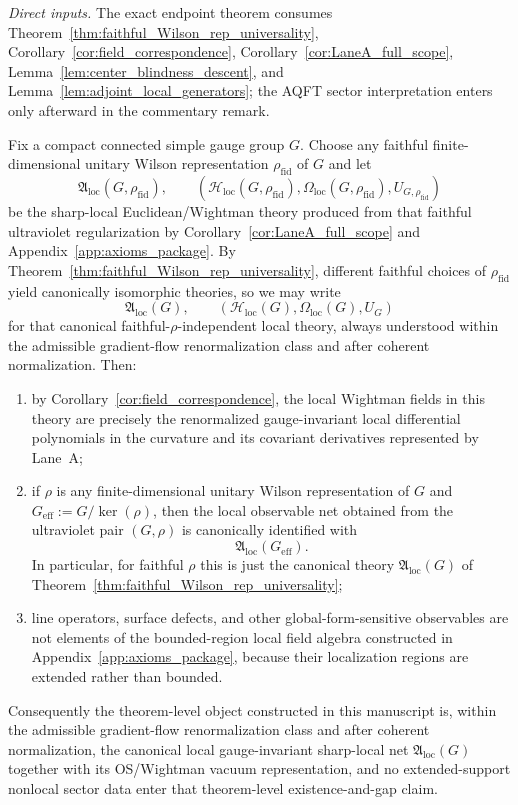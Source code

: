 \noindent\emph{Direct inputs.} The exact endpoint theorem consumes Theorem~\ref{thm:faithful_Wilson_rep_universality}, Corollary~\ref{cor:field_correspondence}, Corollary~\ref{cor:LaneA_full_scope}, Lemma~\ref{lem:center_blindness_descent}, and Lemma~\ref{lem:adjoint_local_generators}; the AQFT sector interpretation enters only afterward in the commentary remark.\par

\begin{theorem}
\label{thm:global_form_local_endpoint}
Fix a compact connected simple gauge group $G$.
Choose any faithful finite-dimensional unitary Wilson representation $\rho_{\mathrm{fid}}$ of $G$ and let
\[
\mathfrak A_{\mathrm{loc}}(G,\rho_{\mathrm{fid}}),
\qquad
(\mathcal H_{\mathrm{loc}}(G,\rho_{\mathrm{fid}}),\Omega_{\mathrm{loc}}(G,\rho_{\mathrm{fid}}),U_{G,\rho_{\mathrm{fid}}})
\]
be the sharp-local Euclidean/Wightman theory produced from that faithful ultraviolet regularization by
Corollary~\ref{cor:LaneA_full_scope} and Appendix~\ref{app:axioms_package}.
By Theorem~\ref{thm:faithful_Wilson_rep_universality}, different faithful choices of $\rho_{\mathrm{fid}}$ yield canonically isomorphic theories,
so we may write
\[
\mathfrak A_{\mathrm{loc}}(G),
\qquad
(\mathcal H_{\mathrm{loc}}(G),\Omega_{\mathrm{loc}}(G),U_G)
\]
for that canonical faithful-$\rho$-independent local theory, always understood within the admissible gradient-flow renormalization class and after coherent normalization.
Then:
\begin{enumerate}[label=(\roman*),leftmargin=2.3em]
\item by Corollary~\ref{cor:field_correspondence}, the local Wightman fields in this theory are precisely the renormalized gauge-invariant local differential polynomials in the curvature and its covariant derivatives represented by Lane~A;
\item if $\rho$ is any finite-dimensional unitary Wilson representation of $G$ and $G_{\mathrm{eff}}:=G/\ker(\rho)$, then the local observable net obtained from the ultraviolet pair $(G,\rho)$ is canonically identified with
\[
\mathfrak A_{\mathrm{loc}}(G_{\mathrm{eff}}).
\]
In particular, for faithful $\rho$ this is just the canonical theory $\mathfrak A_{\mathrm{loc}}(G)$ of Theorem~\ref{thm:faithful_Wilson_rep_universality};
\item line operators, surface defects, and other global-form-sensitive observables are not elements of the bounded-region local field algebra constructed in Appendix~\ref{app:axioms_package}, because their localization regions are extended rather than bounded.
\end{enumerate}
Consequently the theorem-level object constructed in this manuscript is, within the admissible gradient-flow renormalization class and after coherent normalization, the canonical local gauge-invariant sharp-local net $\mathfrak A_{\mathrm{loc}}(G)$ together with its OS/Wightman vacuum representation, and no extended-support nonlocal sector data enter that theorem-level existence-and-gap claim.
\end{theorem}

